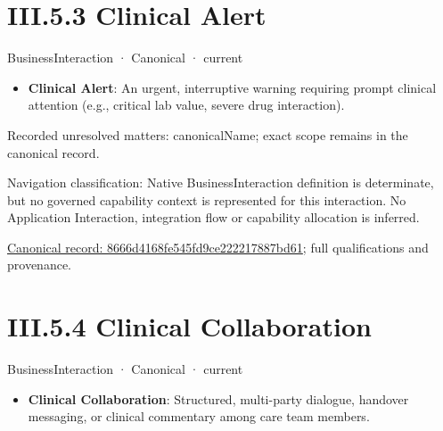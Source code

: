\section*{III.5.3 Clinical Alert}
\label{navigation:III.5.3}

\label{element:8666d4168fe545fd9ce222217887bd61}
{\small BusinessInteraction · Canonical · current}\par

\begin{itemize}


\item \textbf{Clinical Alert}: An urgent, interruptive warning requiring prompt clinical attention (e.g., critical lab value, severe drug interaction).

\end{itemize}

{\small Recorded unresolved matters: canonicalName; exact scope remains in the canonical record.}\par
{\small Navigation classification: Native BusinessInteraction definition is determinate, but no governed capability context is represented for this interaction. No Application Interaction, integration flow or capability allocation is inferred.}\par
{\footnotesize \href{../../../../../../../../continuum/business/business-interaction/8666d4168fe545fd9ce222217887bd61.md}{Canonical record: 8666d4168fe545fd9ce222217887bd61}; full qualifications and provenance.}\par
\section*{III.5.4 Clinical Collaboration}
\label{navigation:III.5.4}

\label{element:f54492b30639431e80cd0723217d6be8}
{\small BusinessInteraction · Canonical · current}\par

\begin{itemize}


\item \textbf{Clinical Collaboration}: Structured, multi-party dialogue, handover messaging, or clinical commentary among care team members.

\end{itemize}

